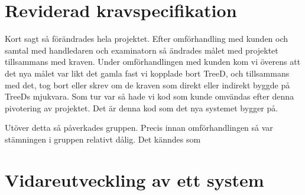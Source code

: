 \section{Reviderad kravspecifikation}
Kort sagt så förändrades hela projektet. Efter omförhandling med kunden och samtal med handledaren och examinatorn så ändrades målet med projektet tillsammans med kraven. Under omförhandlingen med kunden kom vi överens att det nya målet var likt det gamla fast vi kopplade bort TreeD, och tillsammans med det, tog bort eller skrev om de kraven som direkt eller indirekt byggde på TreeDs mjukvara. Som tur var så hade vi kod som kunde omvändas efter denna pivotering  
av projektet. Det är denna kod som det nya systemet bygger på.

Utöver detta så påverkades gruppen. Precis innan omförhandlingen så var stämningen i gruppen relativt dålig. Det känndes som 
\section{Vidareutveckling av ett system}




